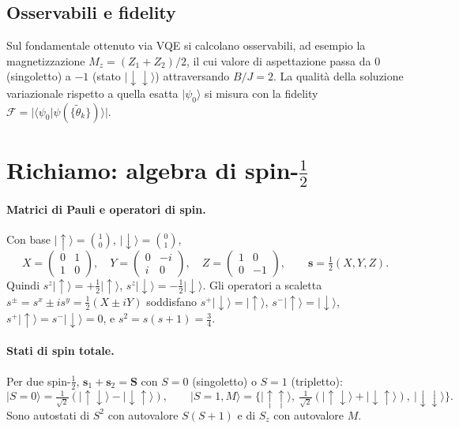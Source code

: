 \documentclass[11pt,a4paper]{article}
\newcommand{\ket}[1]{\lvert #1 \rangle}
\newcommand{\braket}[2]{\langle #1 \vert #2 \rangle}
\newcommand{\up}{\uparrow}
\newcommand{\dn}{\downarrow}
\renewcommand{\vec}[1]{\boldsymbol{#1}}
\newcommand{\sv}{\vec{s}}
\theoremstyle{definition}
\theoremstyle{remark}
\begin{document}
\subsection{Osservabili e fidelity}

Sul fondamentale ottenuto via VQE si calcolano osservabili, ad esempio la magnetizzazione
$M_z=(Z_1+Z_2)/2$, il cui valore di aspettazione passa da $0$ (singoletto) a $-1$ (stato $\ket{\dn\dn}$)
attraversando $B/J=2$. La qualità della soluzione variazionale rispetto a quella esatta $\ket{\psi_0}$ si
misura con la fidelity $\mathcal F=\big|\braket{\psi_0}{\psi(\{\tilde\theta_k\})}\big|$.

\FloatBarrier
\appendix
\section{Richiamo: algebra di spin-$\tfrac12$}
\label{app:spin}

\paragraph{Matrici di Pauli e operatori di spin.} Con base $\ket{\up}=\binom{1}{0}$, $\ket{\dn}=\binom{0}{1}$,
\[
X=\begin{pmatrix}0&1\\1&0\end{pmatrix},\quad Y=\begin{pmatrix}0&-i\\i&0\end{pmatrix},\quad
Z=\begin{pmatrix}1&0\\0&-1\end{pmatrix},\qquad \sv=\tfrac12(X,Y,Z).
\]
Quindi $s^z\ket{\up}=+\tfrac12\ket{\up}$, $s^z\ket{\dn}=-\tfrac12\ket{\dn}$. Gli operatori a scaletta
$s^{\pm}=s^x\pm is^y=\tfrac12(X\pm iY)$ soddisfano $s^+\ket{\dn}=\ket{\up}$, $s^-\ket{\up}=\ket{\dn}$,
$s^+\ket{\up}=s^-\ket{\dn}=0$, e $s^2=s(s+1)=\tfrac34$.

\paragraph{Stati di spin totale.} Per due spin-$\tfrac12$, $\sv_1+\sv_2=\vec S$ con $S=0$ (singoletto) o
$S=1$ (tripletto):
\[
\ket{S{=}0}=\tfrac1{\sqrt2}(\ket{\up\dn}-\ket{\dn\up}),\qquad
\ket{S{=}1,M}=\Big\{\ket{\up\up},\ \tfrac1{\sqrt2}(\ket{\up\dn}+\ket{\dn\up}),\ \ket{\dn\dn}\Big\}.
\]
Sono autostati di $S^2$ con autovalore $S(S+1)$ e di $S_z$ con autovalore $M$.
\end{document}
